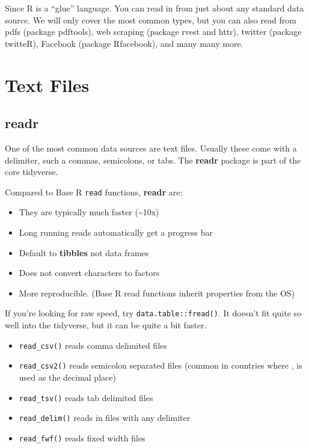 \documentclass[]{book}
\providecommand{\tightlist}{%
  \setlength{\itemsep}{0pt}\setlength{\parskip}{0pt}}
\theoremstyle{definition}
\theoremstyle{definition}
\theoremstyle{definition}
\theoremstyle{remark}
\let\BeginKnitrBlock\begin \let\EndKnitrBlock\end
\begin{document}
Since R is a ``glue'' language. You can read in from just about any
standard data source. We will only cover the most common types, but you
can also read from pdfs (package pdftools), web scraping (package rvest
and httr), twitter (package twitteR), Facebook (package Rfacebook), and
many many more.

\hypertarget{text-files}{%
\section{Text Files}\label{text-files}}

\hypertarget{readr}{%
\subsection{readr}\label{readr}}

One of the most common data sources are text files. Usually these come
with a delimiter, such a commas, semicolons, or tabs. The \textbf{readr}
package is part of the core tidyverse.

Compared to Base R \texttt{read} functions, \textbf{readr} are:

\begin{itemize}
\tightlist
\item
  They are typically much faster (\textasciitilde{}10x)
\item
  Long running reads automatically get a progress bar
\item
  Default to \textbf{tibbles} not data frames
\item
  Does not convert characters to factors
\item
  More reproducible. (Base R read functions inherit properties from the
  OS)
\end{itemize}

\BeginKnitrBlock{rmdtip}
If you're looking for raw speed, try \texttt{data.table::fread()}. It
doesn't fit quite so well into the tidyverse, but it can be quite a bit
faster.
\EndKnitrBlock{rmdtip}

\begin{itemize}
\tightlist
\item
  \texttt{read\_csv()} reads comma delimited files
\item
  \texttt{read\_csv2()} reads semicolon separated files (common in
  countries where , is used as the decimal place)
\item
  \texttt{read\_tsv()} reads tab delimited files
\item
  \texttt{read\_delim()} reads in files with any delimiter
\item
  \texttt{read\_fwf()} reads fixed width files
\end{itemize}
\end{document}
